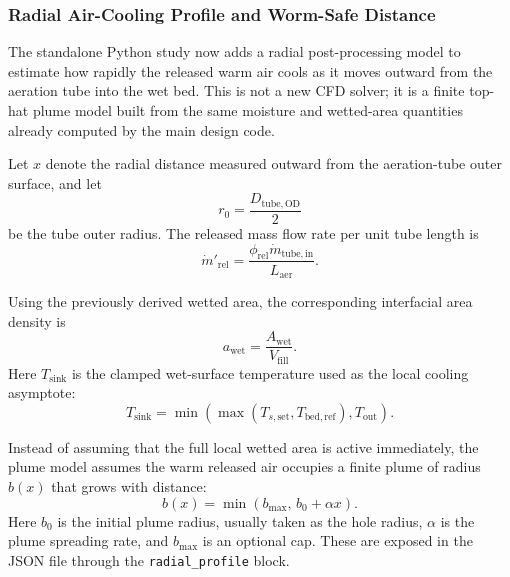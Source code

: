 \documentclass{article}
\begin{document}
\subsubsection{Radial Air-Cooling Profile and Worm-Safe Distance}

The standalone Python study now adds a radial post-processing model to
estimate how rapidly the released warm air cools as it moves outward from the
aeration tube into the wet bed. This is not a new CFD solver; it is a finite
top-hat plume model built from the same moisture and wetted-area quantities
already computed by the main design code.

Let $x$ denote the radial distance measured outward from the aeration-tube
outer surface, and let
\begin{equation}
r_0 = \frac{D_{\mathrm{tube,OD}}}{2}
\end{equation}
be the tube outer radius. The released mass flow rate per unit tube length is
\begin{equation}
\dot{m}'_{\mathrm{rel}}
= \frac{\phi_{\mathrm{rel}} \dot{m}_{\mathrm{tube,in}}}{L_{\mathrm{aer}}}.
\end{equation}

Using the previously derived wetted area, the corresponding interfacial area
density is
\begin{equation}
a_{\mathrm{wet}} = \frac{A_{\mathrm{wet}}}{V_{\mathrm{fill}}}.
\end{equation}
Here $T_{\mathrm{sink}}$ is the clamped wet-surface temperature used as the
local cooling asymptote:
\begin{equation}
T_{\mathrm{sink}}
= \min\!\left(\max(T_{s,\mathrm{set}},T_{\mathrm{bed,ref}}),T_{\mathrm{out}}\right).
\end{equation}

Instead of assuming that the full local wetted area is active immediately,
the plume model assumes the warm released air occupies a finite plume of
radius $b(x)$ that grows with distance:
\begin{equation}
b(x) = \min\!\left(b_{\max},\, b_0 + \alpha x\right).
\end{equation}
Here $b_0$ is the initial plume radius, usually taken as the hole radius,
$\alpha$ is the plume spreading rate, and $b_{\max}$ is an optional cap.
These are exposed in the JSON file through the
\texttt{radial\_profile} block.
\end{document}
